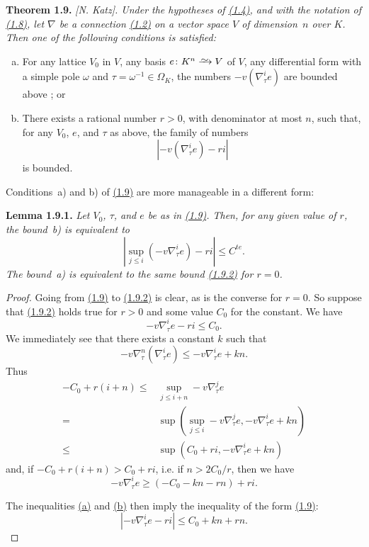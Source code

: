 \documentclass{report}
\newenvironment{itenv}[1]
  {\phantomsection\par\medskip\noindent\textbf{#1.}\itshape}
  {\medskip}
\newcommand{\simto}{\xrightarrow{\raisebox{-0.7ex}[0ex][0ex]{$\sim$}}}
\renewcommand{\geq}{\geqslant}
\renewcommand{\leq}{\leqslant}
\newcommand{\oldpage}[1]{\marginpar{\footnotesize$\Big\vert$ \textit{p.~#1}}}
\begin{document}
\begin{itenv}{Theorem 1.9}
\label{II.1.9}
  \emph{[N. Katz].}
  Under the hypotheses of \hyperref[II.1.4]{(1.4)}, and with the notation of \hyperref[II.1.8]{(1.8)}, let $\nabla$ be a connection \hyperref[II.1.2]{(1.2)} on a vector space $V$ of dimension~$n$ over $K$.
  Then one of the following conditions is satisfied:
  \begin{enumerate}[a)]
    \item For any lattice $V_0$ in $V$, any basis $e\colon K^n\simto V$ of $V$, any differential form with a simple pole $\omega$ and $\tau=\omega^{-1}\in\Omega_K$, the numbers $-v(\nabla_\tau^i e)$ are bounded above ; or
    \item There exists a rational number $r>0$, with denominator at most $n$, such that, for any $V_0$, $e$, and $\tau$ as above, the family of numbers
      \[
        |-v(\nabla_\tau^i e) - ri|
      \]
      is bounded.
  \end{enumerate}
\end{itenv}

Conditions~a) and b) of \hyperref[II.1.9]{(1.9)} are more manageable in a different form:

\begin{itenv}{Lemma 1.9.1}
\label{II.1.9.1}
  Let $V_0$, $\tau$, and $e$ be as in \hyperref[II.1.9]{(1.9)}.
  Then, for any given value of $r$, the bound~b) is equivalent to
  \[
  \label{II.1.9.2}
    |\sup_{j\leq i}(-v\nabla_\tau^i e)-ri| \leq C^{te}.
  \tag{1.9.2}
  \]
  The bound~a) is equivalent to the same bound \hyperref[II.1.9.2]{(1.9.2)} for $r=0$.
\end{itenv}

\begin{proof}
  Going from \hyperref[II.1.9]{(1.9)} to \hyperref[II.1.9.2]{(1.9.2)} is clear, as is the converse for $r=0$.
  So suppose that \hyperref[II.1.9.2]{(1.9.2)} holds true for $r>0$ and some value $C_0$ for the constant.
  We have
  \[
  \label{II.1.9.a}
    -v\nabla_\tau^i e - ri \leq C_0.
  \tag{a}
  \]
  We immediately see that there exists a constant $k$ such that
  \[
    -v\nabla_\tau^n(\nabla_\tau^i e) \leq -v\nabla_\tau^i e + kn.
  \]
\oldpage{46}
  Thus
  \[
    \begin{aligned}
      -C_0 + r(i+n)
      \leq& \sup_{j\leq i+n} -v\nabla_\tau^j e
    \\=& \sup(\sup_{j\leq i} -v\nabla_\tau^j e, -v\nabla_\tau^i e+kn)
    \\\leq& \sup(C_0+ri, -v\nabla_\tau^i e+kn)
    \end{aligned}
  \]
  and, if $-C_0+r(i+n) > C_0+ri$, i.e. if $n>2C_0/r$, then we have
  \[
  \label{II.1.9.b}
    -v\nabla_\tau^i e \geq (-C_0-kn-rn)+ri.
  \tag{b}
  \]

  The inequalities \hyperref[II.1.9.a]{(a)} and \hyperref[II.1.9.b]{(b)} then imply the inequality of the form \hyperref[II.1.9]{(1.9)}:
  \[
    |-v\nabla_\tau^i e - ri| \leq C_0+kn+rn.
  \]
\end{proof}
\end{document}
